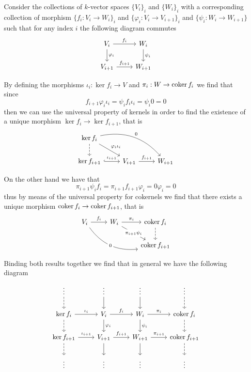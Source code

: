 Consider the collections of \(k\)-vector spaces \(\{V_i\}_i\) and \(\{W_i\}_i\)
with a corresponding collection of morphism \(\{f_i : V_i \to W_i\}_i\) and
\(\{\varphi_i : V_i \to V_{i+1}\}_i\) and \(\{\psi_i : W_i \to W_{i+1}\}\) such
that for any index \(i\) the following diagram commutes
\[
  \begin{tikzcd}
    V_i \rar["f_i"] \dar["\varphi_i"] &W_i \dar["\psi_i"]
    \\
    V_{i+1} \rar["f_{i+1}"] &W_{i+1}
  \end{tikzcd}
\]

By defining the morphisms \(\iota_i : \ker f_i \to V\) and \(\pi_i : W \to
\operatorname{coker} f_i\) we find that since
\[
  f_{i+1}  \varphi_i  \iota_i
  = \psi_i  f_i  \iota_i
  = \psi_i  0 = 0
\]
then we can use the universal property of kernels in order to find the existence
of a unique morphism \(\ker f_i \to \ker f_{i+1}\), that is
\[
  \begin{tikzcd}
    \ker f_i \dar[dashed] \ar[dr, "\varphi_i  \iota_i"] \ar[drr, bend
    left, "0"] & &
    \\
    \ker f_{i+1} \rar[hook, "\iota_{i+1}"] &V_{i+1} \rar["f_{i+1}"] &W_{i+1}
  \end{tikzcd}
\]

On the other hand we have that
\[
  \pi_{i+1}  \psi_i  f_i
  = \pi_{i+1}  f_{i+1}  \varphi_i
  = 0  \varphi_i = 0
\]
thus by means of the universal property for cokernels we find that there exists
a unique morphism \(\operatorname{coker} f_i \to \operatorname{coker} f_{i+1}\), that is
\[
  \begin{tikzcd}
    V_i \rar["f_i"] \ar[drr, bend right, "0" description]
      &W_i \rar["\pi_i"] \ar[dr, "\pi_{i+1}  \psi_i" description]
    &\coker f_i \dar[dashed]
    \\
    & &\coker f_{i+1}
  \end{tikzcd}
\]

Binding both results together we find that in general we have the following
diagram
\[
  \begin{tikzcd}
    \vdots \dar[dashed] &\vdots \dar &\vdots \dar &\vdots \dar[dashed]
    \\
    \ker f_i \rar["\iota_i"] \dar[dashed]
      &V_i \rar["f_i"] \dar["\varphi_i"]
    &W_i \dar["\psi_i"] \rar["\pi_i"]
      &\coker f_i \dar[dashed]
    \\
    \ker f_{i+1} \rar["\iota_{i+1}"] \dar[dashed]
      &V_{i+1} \rar["f_{i+1}"] \dar
    &W_{i+1} \rar["\pi_{i+1}"] \dar
      &\coker f_{i+1} \dar[dashed]
    \\
    \vdots &\vdots &\vdots &\vdots
  \end{tikzcd}
\]

